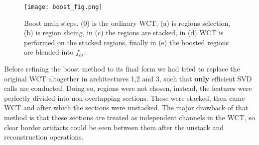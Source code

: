 \begin{figure}[h!]
	\centering
	\texttt{[image: boost\_fig.png]}
	\caption{Boost main steps. (0) is the ordinary WCT, (a) is regions selection, (b) is region slicing, in (c) the regions are stacked, in (d) WCT is performed on the stacked regions, finally in (e) the boosted regions are blended into $f_{cs}$.}
	\label{fig:boost}
\end{figure}

Before refining the boost method to its final form we had tried to replace the original WCT altogether in architectures 1,2 and 3, such that \textbf{only} efficient SVD calls are conducted. Doing so, regions were not chosen, instead, the features were perfectly divided into non overlapping sections. These were stacked, then came WCT and after which the sections were unstacked. The major drawback of that method is that these sections are treated as independent channels in the WCT, so clear border artifacts could be seen between them after the unstack and reconstruction operations.



